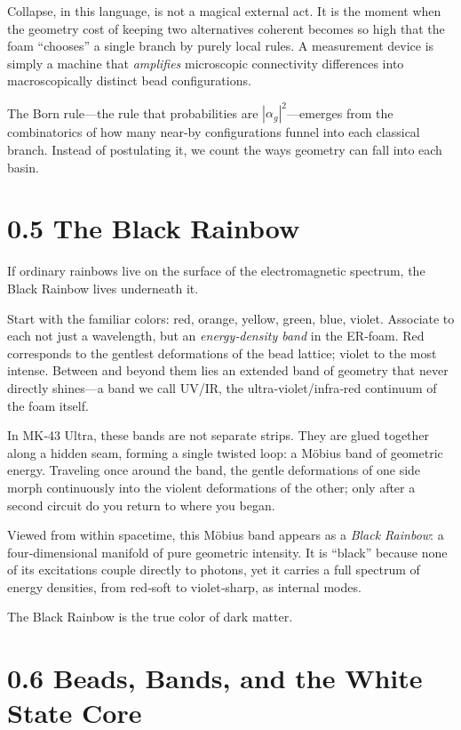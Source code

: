 Collapse, in this language, is not a magical external act. It is the moment when the geometry cost of keeping two alternatives coherent becomes so high that the foam ``chooses'' a single branch by purely local rules. A measurement device is simply a machine that \emph{amplifies} microscopic connectivity differences into macroscopically distinct bead configurations.

The Born rule---the rule that probabilities are $|\alpha_g|^2$---emerges from the combinatorics of how many near‑by configurations funnel into each classical branch. Instead of postulating it, we count the ways geometry can fall into each basin.

\section*{0.5 The Black Rainbow}

If ordinary rainbows live on the surface of the electromagnetic spectrum, the Black Rainbow lives underneath it.

Start with the familiar colors: red, orange, yellow, green, blue, violet. Associate to each not just a wavelength, but an \emph{energy‑density band} in the ER‑foam. Red corresponds to the gentlest deformations of the bead lattice; violet to the most intense. Between and beyond them lies an extended band of geometry that never directly shines---a band we call UV/IR, the ultra‑violet/infra‑red continuum of the foam itself.

In MK‑43 Ultra, these bands are not separate strips. They are glued together along a hidden seam, forming a single twisted loop: a Möbius band of geometric energy. Traveling once around the band, the gentle deformations of one side morph continuously into the violent deformations of the other; only after a second circuit do you return to where you began.

Viewed from within spacetime, this Möbius band appears as a \emph{Black Rainbow}: a four‑dimensional manifold of pure geometric intensity. It is ``black'' because none of its excitations couple directly to photons, yet it carries a full spectrum of energy densities, from red‑soft to violet‑sharp, as internal modes.

The Black Rainbow is the true color of dark matter.

\section*{0.6 Beads, Bands, and the White State Core}

